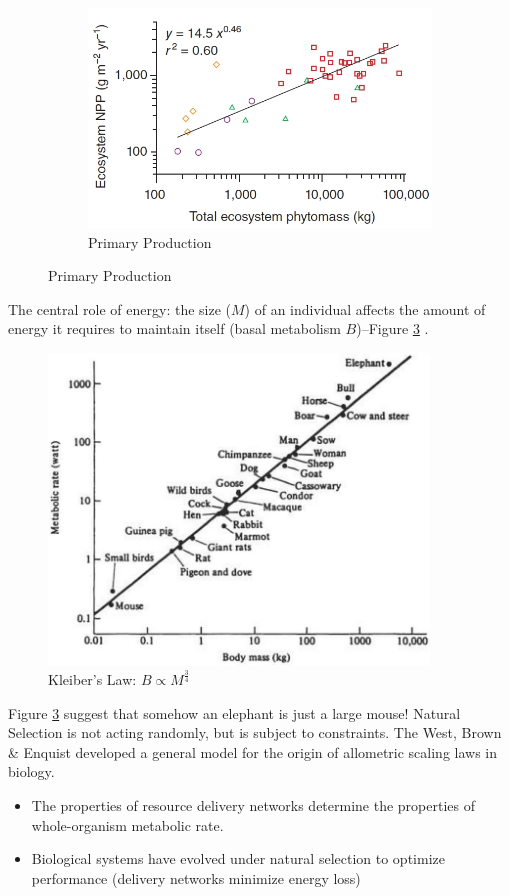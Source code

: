 \documentclass[]{article}
\begin{document}
\begin{figure}[H]
\begin{subfigure}[b]{0.45\textwidth}
		\caption{Primary Production}\label{fig:npp}
		\includegraphics[width=\textwidth]{Scaling3}
	\end{subfigure}
\end{figure}

The central role of energy: the size ($M$) of an individual affects the amount
of energy it requires to maintain itself (basal metabolism $B$)--Figure \ref{fig:Kleiber} \cite{schmidt1984scaling}.

\begin{figure}[H]
	\caption{Kleiber's Law: $B \propto M^\frac{3}{4}$}\label{fig:Kleiber}
	\includegraphics[width=0.9\textwidth]{Kleiber}
\end{figure}

Figure \ref{fig:Kleiber} suggest that somehow an elephant is just a large mouse! Natural Selection is not acting randomly, but is subject to constraints. The West, Brown \& Enquist developed a general model for the origin of allometric scaling laws in biology\cite{west1997general}.
\begin{itemize}
	\item The properties of resource delivery networks determine
	the properties of whole-organism metabolic rate.
	\item  Biological systems have evolved under natural
	selection to optimize performance (delivery networks
	minimize energy loss)
\end{itemize}
\end{document}
